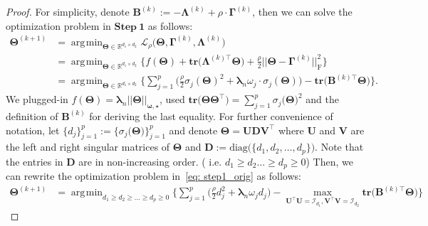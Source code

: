 \documentclass[alpha-refs]{wiley-article}
\DeclareMathOperator*{\argmin}{\arg\!\min}
\begin{document}
\begin{proof}
For simplicity, denote $\boldsymbol{B}^{(k)}:=-\boldsymbol{\Lambda}^{(k)}+\rho \cdot \boldsymbol{\Gamma}^{(k)}$, then we can solve the optimization problem in $\textbf{Step}\ \boldsymbol{1}$ as follows:
\begin{align}
    \boldsymbol{\Theta}^{(k+1)} 
    &= \argmin_{\boldsymbol{\Theta}\in\mathbb{R}^{d_{1} \times d_{2}}} \mathcal{L}_{\rho} \big( \boldsymbol{\Theta},\boldsymbol{\Gamma}^{(k)},\boldsymbol{\Lambda}^{(k)} \big) \nonumber \\
    &= \argmin_{\boldsymbol{\Theta}\in\mathbb{R}^{d_{1} \times d_{2}}}  \bigg\{ f(\boldsymbol{\Theta}) + \textbf{tr}\big(\boldsymbol{\Lambda}^{(k) \top}\boldsymbol{\Theta}\big) + \frac{\rho}{2} || \boldsymbol{\Theta}-\boldsymbol{\Gamma}^{(k)} ||_{\text{F}}^{2} \bigg\}  \nonumber \\
    &= \argmin_{\boldsymbol{\Theta}\in\mathbb{R}^{d_{1} \times d_{2}}} \bigg\{ \sum_{j=1}^{p} \bigg( \frac{\rho}{2}\sigma_{j}(\boldsymbol{\Theta})^{2} + \boldsymbol{\lambda}_{n} \omega_{j} \cdot\sigma_{j}(\boldsymbol{\Theta}) \bigg) -\textbf{tr} \big( \boldsymbol{B}^{(k) \top}\boldsymbol{\Theta} \big) \bigg\} \label{eq: step1_orig}.
\end{align}
We plugged-in $f(\boldsymbol{\Theta})=\boldsymbol{\lambda}_{n}||\boldsymbol{\Theta}||_{\boldsymbol{\omega,\star}}$, 
used $\textbf{tr}\big(\boldsymbol{\Theta}\boldsymbol{\Theta}^{\top}\big)=\sum_{j=1}^{p}\sigma_{j}\big(\boldsymbol{\Theta}\big)^{2}$ and the definition of $\boldsymbol{B}^{(k)}$ for deriving the last equality.
For further convenience of notation, let $\{d_{j}\}_{j=1}^{p}:=\{\sigma_{j}\big(\boldsymbol{\Theta}\big)\}_{j=1}^{p}$ and 
denote $\boldsymbol{\Theta}=\boldsymbol{UDV^{\top}}$ where 
$\boldsymbol{U}$ and $\boldsymbol{V}$ are the left and right singular matrices of $\boldsymbol{\Theta}$ and $\boldsymbol{D}:=\text{diag}\big(\{d_{1},d_{2},\dots,d_{p}\}\big)$.
Note that the entries in $\boldsymbol{D}$ are in non-increasing order. ( i.e. $d_{1} \geq d_{2} \dots \geq d_{p} \geq 0$)
Then, we can rewrite the optimization problem in~\eqref{eq: step1_orig} as follows:
\begin{align}
    \boldsymbol{\Theta}^{(k+1)} 
    &= \argmin_{d_{1}\geq d_{2}\geq \dots \geq d_{p} \geq 0 }\bigg\{ \sum_{j=1}^{p} \bigg( \frac{\rho}{2} d_{j}^{2} + \boldsymbol{\lambda}_{n}\omega_{j}d_{j} \bigg) - \max_{\boldsymbol{U}^{\top}\boldsymbol{U} = \mathcal{I}_{d_{1}}, \boldsymbol{V}^{\top}\boldsymbol{V} = \mathcal{I}_{d_{2}}} \textbf{tr}\big(\boldsymbol{B}^{(k)\top}\boldsymbol{\Theta}\big) \bigg\} \label{eq: step1_sec} 

\end{align}
\end{proof}
\end{document}
